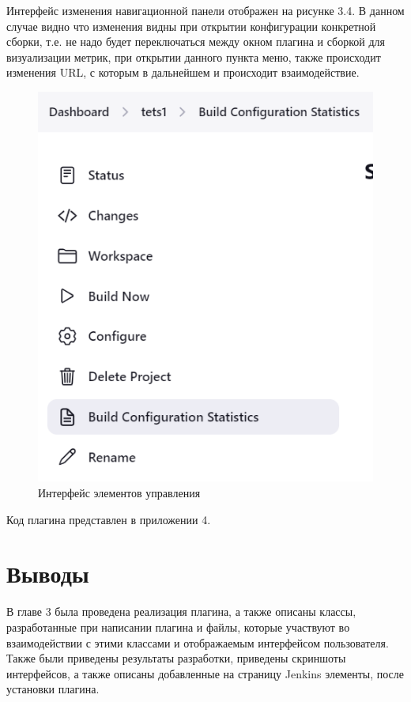 Интерфейс изменения навигационной панели отображен на рисунке 3.4. В данном случае видно что изменения видны при открытии конфигурации конкретной сборки, т.е. не надо будет переключаться между окном плагина и сборкой для визуализации метрик, при открытии данного пункта меню, также происходит изменения URL, с которым в дальнейшем и происходит взаимодействие.

\begin{figure}[ht!] 
	\center
	\includegraphics [scale=0.47] {my_folder/images//ui3}
	\caption{Интерфейс элементов управления} 
	\label{fig:ui3}  
\end{figure}


Код плагина представлен в приложении 4.
 
\section{Выводы} \label{ch3:sec3}

В главе 3 была проведена реализация плагина, а также описаны классы, разработанные при написании плагина и файлы, которые участвуют во взаимодействии с этими классами и отображаемым интерфейсом пользователя. Также были приведены результаты разработки, приведены скриншоты интерфейсов, а также описаны добавленные на страницу Jenkins элементы, после установки плагина.





